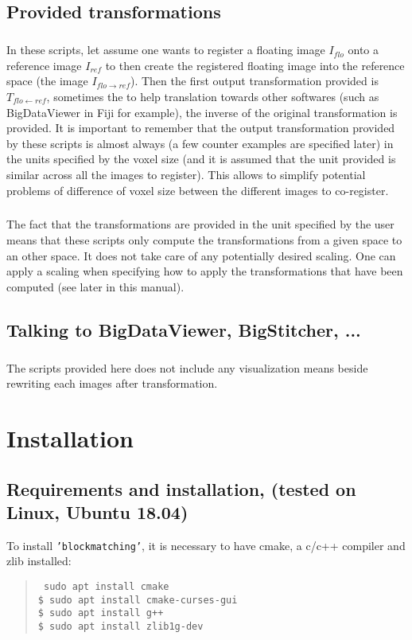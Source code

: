 \documentclass[10pt,a4paper]{book}
\newcommand{\option}[1]{{\texttt{'#1'}}}
\newcommand{\T}[2]{T_{{#1}\leftarrow{#2}}}
\newenvironment{code}[1]{\mbox{}\\[1ex]\hspace*{-#1cm}\begin{minipage}{150mm}\begin{quote}\tt}{\end{quote}\end{minipage}\mbox{}\\[1ex]}
\begin{document}
\section{Provided transformations}
\paragraph{}In these scripts, let assume one wants to register a floating image $I_{flo}$ onto a reference image $I_{ref}$ to then create the registered floating image into the reference space (the image $I_{flo\rightarrow ref}$). Then the first output transformation provided is $\T{flo}{ref}$, sometimes the to help translation towards other softwares (such as BigDataViewer in Fiji for example), the inverse of the original transformation is provided. It is important to remember that the output transformation provided by these scripts is almost always (a few counter examples are specified later) in the units specified by the voxel size (and it is assumed that the unit provided is similar across all the images to register). This allows to simplify potential problems of difference of voxel size between the different images to co-register.
\paragraph{}The fact that the transformations are provided in the unit specified by the user means that these scripts only compute the transformations from a given space to an other space. It does not take care of any potentially desired scaling. One can apply a scaling when specifying how to apply the transformations that have been computed (see later in this manual).
\section{Talking to BigDataViewer, BigStitcher, ...}
\paragraph{}The scripts provided here does not include any visualization means beside rewriting each images after transformation. 
\chapter{Installation}
\section{Requirements and installation, (tested on Linux, Ubuntu 18.04)}
To install \option{blockmatching}, it is necessary to have cmake, a c/c++ compiler and zlib installed:
  \begin{code}{0.8}
    \$ sudo apt install cmake \\
    \$ sudo apt install cmake-curses-gui \\
    \$ sudo apt install g++ \\
    \$ sudo apt install zlib1g-dev
  \end{code}\\
  
\end{document}

